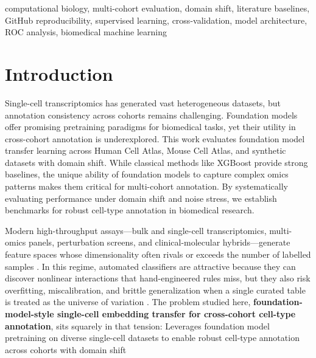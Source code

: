 \documentclass[10pt,journal]{IEEEtran}
\begin{document}
\begin{IEEEkeywords}
computational biology, multi-cohort evaluation, domain shift, literature baselines,
GitHub reproducibility, supervised learning, cross-validation, model architecture,
ROC analysis, biomedical machine learning
\end{IEEEkeywords}

\section{Introduction}
\label{sec:intro}
Single-cell transcriptomics has generated vast heterogeneous datasets, but annotation consistency across cohorts remains challenging. Foundation models offer promising pretraining paradigms for biomedical tasks, yet their utility in cross-cohort annotation is underexplored. This work evaluates foundation model transfer learning across Human Cell Atlas, Mouse Cell Atlas, and synthetic datasets with domain shift. While classical methods like XGBoost provide strong baselines, the unique ability of foundation models to capture complex omics patterns makes them critical for multi-cohort annotation. By systematically evaluating performance under domain shift and noise stress, we establish benchmarks for robust cell-type annotation in biomedical research.

Modern high-throughput assays---bulk and single-cell transcriptomics, multi-omics panels,
perturbation screens, and clinical-molecular hybrids---generate feature spaces whose
dimensionality often rivals or exceeds the number of labelled samples
\cite{breiman2001,cortes1995,friedman2001}. In this regime, automated classifiers are attractive because they can
discover nonlinear interactions that hand-engineered rules miss, but they also risk
overfitting, miscalibration, and brittle generalization when a single curated table is
treated as the universe of variation \cite{cortes1995,chen2016,lecun2015}. The problem studied here,
\textbf{foundation-model-style single-cell embedding transfer for cross-cohort cell-type annotation}, sits squarely in that tension: Leverages foundation model pretraining on diverse single-cell datasets to enable robust cell-type annotation across cohorts with domain shift
\end{document}
